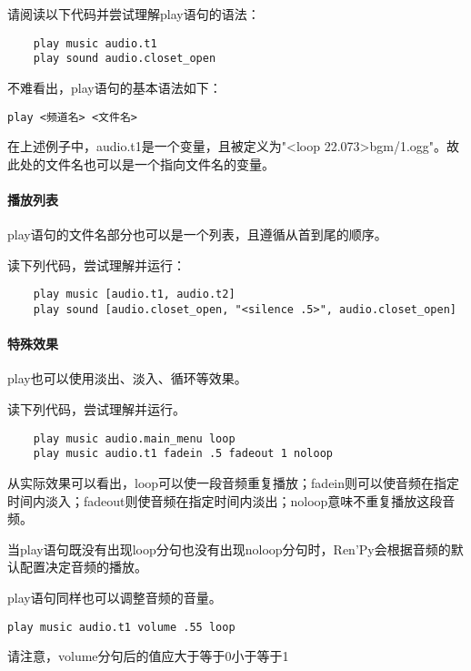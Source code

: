 请阅读以下代码并尝试理解play语句的语法：

\begin{lstlisting}
    play music audio.t1
    play sound audio.closet_open
\end{lstlisting}

不难看出，play语句的基本语法如下：
\begin{lstlisting}[numbers=none]
play <频道名> <文件名>
\end{lstlisting}

\begin{ExtraKnowledge}
    在上述例子中，audio.t1是一个变量，且被定义为"<loop 22.073>bgm/1.ogg"。故此处的文件名也可以是一个指向文件名的变量。
\end{ExtraKnowledge}

\paragraph{播放列表}
play语句的文件名部分也可以是一个列表，且遵循从首到尾的顺序。

读下列代码，尝试理解并运行：
\begin{lstlisting}
    play music [audio.t1, audio.t2]
    play sound [audio.closet_open, "<silence .5>", audio.closet_open]
\end{lstlisting}


\paragraph{特殊效果}
play也可以使用淡出、淡入、循环等效果。

读下列代码，尝试理解并运行。
\begin{lstlisting}
    play music audio.main_menu loop
    play music audio.t1 fadein .5 fadeout 1 noloop
\end{lstlisting}

从实际效果可以看出，loop可以使一段音频重复播放；fadein则可以使音频在指定时间内淡入；fadeout则使音频在指定时间内淡出；noloop意味不重复播放这段音频。

\begin{ExtraKnowledge}
    当play语句既没有出现loop分句也没有出现noloop分句时，Ren'Py会根据音频的默认配置决定音频的播放。
\end{ExtraKnowledge}

play语句同样也可以调整音频的音量。
\begin{lstlisting}[numbers=none]
    play music audio.t1 volume .55 loop
\end{lstlisting}
请注意，volume分句后的值应大于等于0小于等于1


